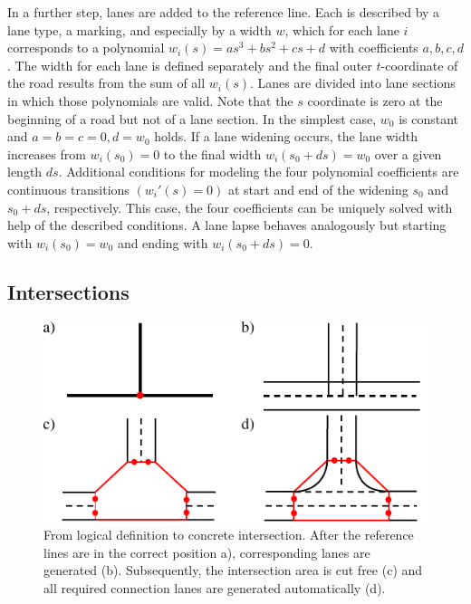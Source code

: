 \documentclass[a4paper, 10pt, conference]{ieeeconf}      %
\begin{document}
    In a further step, lanes are added to the reference line. Each is described by a lane type, a marking, and especially by a width $w$, which for each lane $i$ corresponds to a polynomial $w_i(s)=as^3 + bs^2 + cs + d$ with coefficients \(a,b,c,d\). The width for each lane is defined separately and the final outer $t$-coordinate of the road results from the sum of all $w_i(s)$. Lanes are divided into lane sections in which those polynomials are valid. Note that the $s$ coordinate is zero at the beginning of a road but not of a lane section. In the simplest case, $w_0$ is constant and $a=b=c=0, d=w_0$ holds. If a lane widening occurs, the lane width increases from $w_i(s_0)=0$ to the final width $w_i(s_0+ds)=w_0$ over a given length $ds$. Additional conditions for modeling the four polynomial coefficients are continuous transitions \(\left(w_i'(s) = 0\right)\) at start and end of the widening $s_0$ and $s_0 + ds$, respectively. This case, the four coefficients can be uniquely solved with help of the described conditions. A lane lapse behaves analogously but starting with $w_i(s_0)=w_0$ and ending with $w_i(s_0+ds)=0$.
        
\subsection{Intersections}\label{sec_inters}
    \begin{figure}[tb]        
        \centering
        \includegraphics{fig/createJunction.pdf}
        \caption{From logical definition to concrete intersection. After the reference lines are in the correct position a), corresponding lanes are generated (b). Subsequently, the intersection area is cut free (c) and all required connection lanes are generated automatically (d).}
        \label{fig_createJunction}
    \end{figure}
	
\end{document}
